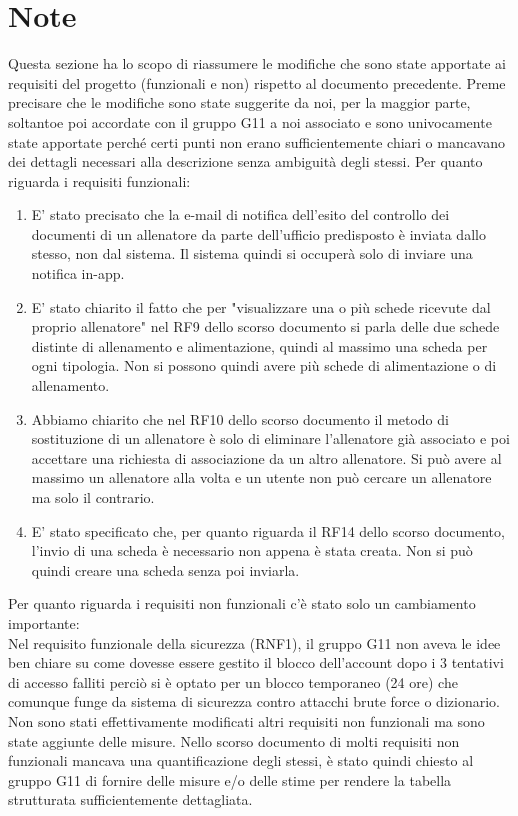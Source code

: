 \documentclass{article}
\begin{document}
\section{Note}
Questa sezione ha lo scopo di riassumere le modifiche che sono state apportate ai requisiti del progetto (funzionali e non) rispetto al documento
precedente. Preme precisare che le modifiche sono state suggerite da noi, per la maggior parte, soltantoe poi accordate con il gruppo G11 a noi associato e sono univocamente
state apportate perché certi punti non erano sufficientemente chiari o mancavano dei dettagli necessari alla descrizione senza ambiguità degli
stessi.
Per quanto riguarda i requisiti funzionali:
\begin{enumerate}
    \item E' stato precisato che la e-mail di notifica dell'esito del controllo dei documenti di un allenatore da parte dell'ufficio predisposto è
            inviata dallo stesso, non dal sistema. Il sistema quindi si occuperà solo di inviare una notifica in-app.
    \item E' stato chiarito il fatto che per "visualizzare una o più schede ricevute dal proprio allenatore" nel RF9 dello scorso documento si parla
             delle due schede distinte di allenamento e alimentazione, quindi al massimo una scheda per ogni tipologia. Non si possono quindi avere più
            schede di alimentazione o di allenamento.
    \item Abbiamo chiarito che nel RF10 dello scorso documento il metodo di sostituzione di un allenatore è solo di eliminare l'allenatore già
            associato e poi accettare una richiesta di associazione da un altro allenatore. Si può avere al massimo un allenatore alla volta e un utente
            non può cercare un allenatore ma solo il contrario.
    \item E' stato specificato che, per quanto riguarda il RF14 dello scorso documento, l'invio di una scheda è necessario non appena è stata creata.
            Non si può quindi creare una scheda senza poi inviarla.
\end{enumerate}
Per quanto riguarda i requisiti non funzionali c’è stato solo un cambiamento importante:\\
Nel requisito funzionale della sicurezza (RNF1), il gruppo G11 non aveva le idee ben chiare su come dovesse essere gestito il blocco dell’account
dopo i 3 tentativi di accesso falliti perciò si è optato per un blocco temporaneo (24 ore) che comunque funge da sistema di sicurezza contro
attacchi brute force o dizionario.\\
Non sono stati effettivamente modificati altri requisiti non funzionali ma sono state aggiunte delle misure. Nello scorso documento di molti
requisiti non funzionali mancava una quantificazione degli stessi, è stato quindi chiesto al gruppo G11 di fornire delle misure e/o delle stime
per rendere la tabella strutturata sufficientemente dettagliata.\\
\end{document}
